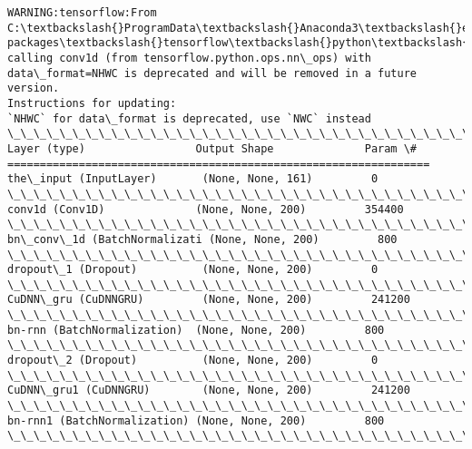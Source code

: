 \documentclass[11pt]{article}
\begin{document}
    \begin{Verbatim}[commandchars=\\\{\}]
WARNING:tensorflow:From C:\textbackslash{}ProgramData\textbackslash{}Anaconda3\textbackslash{}envs\textbackslash{}nbkeras\textbackslash{}lib\textbackslash{}site-packages\textbackslash{}tensorflow\textbackslash{}python\textbackslash{}util\textbackslash{}deprecation.py:497: calling conv1d (from tensorflow.python.ops.nn\_ops) with data\_format=NHWC is deprecated and will be removed in a future version.
Instructions for updating:
`NHWC` for data\_format is deprecated, use `NWC` instead
\_\_\_\_\_\_\_\_\_\_\_\_\_\_\_\_\_\_\_\_\_\_\_\_\_\_\_\_\_\_\_\_\_\_\_\_\_\_\_\_\_\_\_\_\_\_\_\_\_\_\_\_\_\_\_\_\_\_\_\_\_\_\_\_\_
Layer (type)                 Output Shape              Param \#   
=================================================================
the\_input (InputLayer)       (None, None, 161)         0         
\_\_\_\_\_\_\_\_\_\_\_\_\_\_\_\_\_\_\_\_\_\_\_\_\_\_\_\_\_\_\_\_\_\_\_\_\_\_\_\_\_\_\_\_\_\_\_\_\_\_\_\_\_\_\_\_\_\_\_\_\_\_\_\_\_
conv1d (Conv1D)              (None, None, 200)         354400    
\_\_\_\_\_\_\_\_\_\_\_\_\_\_\_\_\_\_\_\_\_\_\_\_\_\_\_\_\_\_\_\_\_\_\_\_\_\_\_\_\_\_\_\_\_\_\_\_\_\_\_\_\_\_\_\_\_\_\_\_\_\_\_\_\_
bn\_conv\_1d (BatchNormalizati (None, None, 200)         800       
\_\_\_\_\_\_\_\_\_\_\_\_\_\_\_\_\_\_\_\_\_\_\_\_\_\_\_\_\_\_\_\_\_\_\_\_\_\_\_\_\_\_\_\_\_\_\_\_\_\_\_\_\_\_\_\_\_\_\_\_\_\_\_\_\_
dropout\_1 (Dropout)          (None, None, 200)         0         
\_\_\_\_\_\_\_\_\_\_\_\_\_\_\_\_\_\_\_\_\_\_\_\_\_\_\_\_\_\_\_\_\_\_\_\_\_\_\_\_\_\_\_\_\_\_\_\_\_\_\_\_\_\_\_\_\_\_\_\_\_\_\_\_\_
CuDNN\_gru (CuDNNGRU)         (None, None, 200)         241200    
\_\_\_\_\_\_\_\_\_\_\_\_\_\_\_\_\_\_\_\_\_\_\_\_\_\_\_\_\_\_\_\_\_\_\_\_\_\_\_\_\_\_\_\_\_\_\_\_\_\_\_\_\_\_\_\_\_\_\_\_\_\_\_\_\_
bn-rnn (BatchNormalization)  (None, None, 200)         800       
\_\_\_\_\_\_\_\_\_\_\_\_\_\_\_\_\_\_\_\_\_\_\_\_\_\_\_\_\_\_\_\_\_\_\_\_\_\_\_\_\_\_\_\_\_\_\_\_\_\_\_\_\_\_\_\_\_\_\_\_\_\_\_\_\_
dropout\_2 (Dropout)          (None, None, 200)         0         
\_\_\_\_\_\_\_\_\_\_\_\_\_\_\_\_\_\_\_\_\_\_\_\_\_\_\_\_\_\_\_\_\_\_\_\_\_\_\_\_\_\_\_\_\_\_\_\_\_\_\_\_\_\_\_\_\_\_\_\_\_\_\_\_\_
CuDNN\_gru1 (CuDNNGRU)        (None, None, 200)         241200    
\_\_\_\_\_\_\_\_\_\_\_\_\_\_\_\_\_\_\_\_\_\_\_\_\_\_\_\_\_\_\_\_\_\_\_\_\_\_\_\_\_\_\_\_\_\_\_\_\_\_\_\_\_\_\_\_\_\_\_\_\_\_\_\_\_
bn-rnn1 (BatchNormalization) (None, None, 200)         800       
\_\_\_\_\_\_\_\_\_\_\_\_\_\_\_\_\_\_\_\_\_\_\_\_\_\_\_\_\_\_\_\_\_\_\_\_\_\_\_\_\_\_\_\_\_\_\_\_\_\_\_\_\_\_\_\_\_\_\_\_\_\_\_\_\_

\end{Verbatim}
\end{document}
